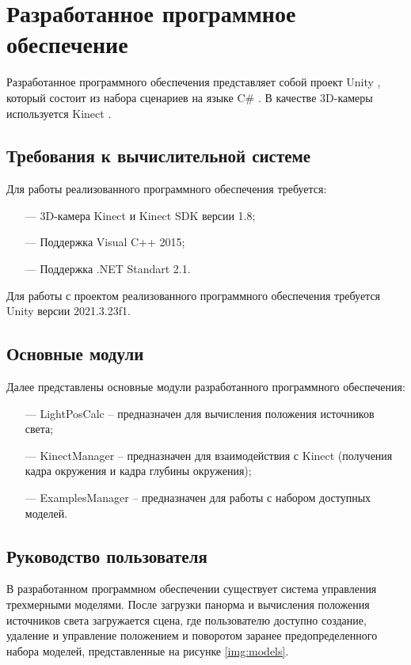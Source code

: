 \section{Разработанное программное обеспечение}

Разработанное программного обеспечения представляет собой проект Unity \cite{unity}, который состоит из набора сценариев на языке C\# \cite{c-sharp}. В качестве 3D-камеры используется Kinect \cite{kinect}.

\subsection{Требования к вычислительной системе}

Для работы реализованного программного обеспечения требуется:

\begin{itemize}
	\item[---] 3D-камера Kinect и Kinect SDK версии 1.8;
	\item[---] Поддержка Visual C++ 2015;
	\item[---] Поддержка .NET Standart 2.1.
\end{itemize}

Для работы с проектом реализованного программного обеспечения требуется Unity версии 2021.3.23f1.

\subsection{Основные модули}

Далее представлены основные модули разработанного программного обеспечения:

\begin{itemize}
	\item[---] LightPosCalc -- предназначен для вычисления положения источников света;
	\item[---] KinectManager -- предназначен для взаимодействия с Kinect (получения кадра окружения и кадра глубины окружения);
	\item[---] ExamplesManager -- предназначен для работы с набором доступных моделей.
\end{itemize}

\subsection{Руководство пользователя}

В разработанном программном обеспечении существует система управления трехмерными моделями. После загрузки панорма и вычисления положения источников света загружается сцена, где пользователю доступно создание, удаление и управление положением и поворотом заранее предопределенного набора моделей, представленные на рисунке \ref{img:models}. 

